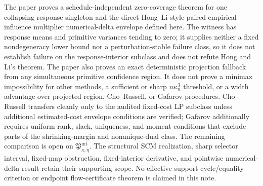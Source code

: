 \documentclass{article}
\begin{document}
The paper proves a schedule-independent zero-coverage theorem for one collapsing-response singleton and the direct Hong--Li-style paired empirical-influence multiplier numerical-delta envelope defined here. The witness has response means and primitive variances tending to zero; it supplies neither a fixed nondegeneracy lower bound nor a perturbation-stable failure class, so it does not establish failure on the response-interior subclass and does not refute Hong and Li's theorem. The paper also proves an exact deterministic projection fallback from any simultaneous primitive confidence region. It does not prove a minimax impossibility for other methods, a sufficient or sharp \(n\kappa_n^3\) threshold, or a width advantage over projected-region, Cho--Russell, or Gafarov procedures. Cho--Russell transfers cleanly only to the audited fixed-cost LP subclass unless additional estimated-cost envelope conditions are verified; Gafarov additionally requires uniform rank, slack, uniqueness, and moment conditions that exclude parts of the shrinking-margin and nonunique-dual class. The remaining comparison is open on \(\mathfrak P_{\kappa,\eta}^{\mathrm{int}}\). The structural SCM realization, sharp selector interval, fixed-map obstruction, fixed-interior derivative, and pointwise numerical-delta result retain their supporting scope. No effective-support cycle/equality criterion or endpoint flow-certificate theorem is claimed in this note.
\end{document}
